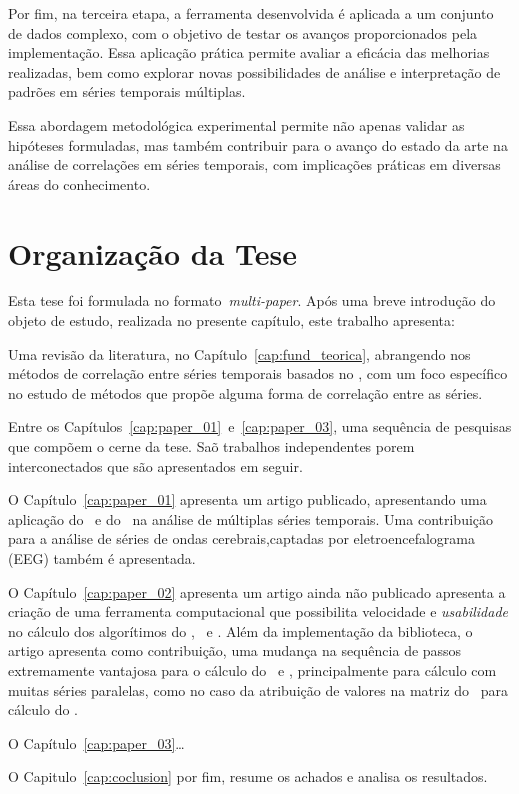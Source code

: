Por fim, na terceira etapa, a ferramenta desenvolvida é aplicada a um conjunto de dados complexo, com o objetivo de testar os avanços proporcionados pela implementação. Essa aplicação prática permite avaliar a eficácia das melhorias realizadas, bem como explorar novas possibilidades de análise e interpretação de padrões em séries temporais múltiplas.

Essa abordagem metodológica experimental permite não apenas validar as hipóteses formuladas, mas também contribuir para o avanço do estado da arte na análise de correlações em séries temporais, com implicações práticas em diversas áreas do conhecimento.

\section{Organização da Tese}
\label{sec:organizacao}

Esta tese foi formulada no formato~\emph{multi-paper}. Após uma breve introdução do objeto de estudo, realizada no presente capítulo, este trabalho apresenta:

Uma revisão da literatura, no Capítulo~\ref{cap:fund_teorica}, abrangendo nos métodos de correlação entre séries temporais basados no \dfa, com um foco específico no estudo de métodos que propõe alguma forma de correlação entre as séries.

Entre os Capítulos~\ref{cap:paper_01}~e~\ref{cap:paper_03}, uma sequência de pesquisas que compõem o cerne da tese. Saõ trabalhos independentes porem interconectados que são apresentados em seguir. 

O Capítulo~\ref{cap:paper_01} apresenta um artigo publicado, apresentando uma aplicação do \pdcca~e do \dmc~na análise de múltiplas séries temporais. Uma contribuição para a análise de séries de ondas cerebrais,captadas por eletroencefalograma (EEG) também é apresentada.

O Capítulo~\ref{cap:paper_02} apresenta um artigo ainda não publicado apresenta a criação de uma ferramenta computacional que possibilita velocidade e \emph{usabilidade} no cálculo dos algorítimos do \dfa, \dcca~e \pdcca. Além da implementação da biblioteca, o artigo apresenta como contribuição, uma mudança na sequência de passos extremamente vantajosa para o cálculo do \dcca~e \pdcca, principalmente para cálculo com muitas séries paralelas, como no caso da atribuição de valores na matriz do \pdcca~para cálculo do \dmc.

O Capítulo~\ref{cap:paper_03}\dots

O Capitulo~\ref{cap:coclusion} por fim, resume os achados e analisa os resultados. 